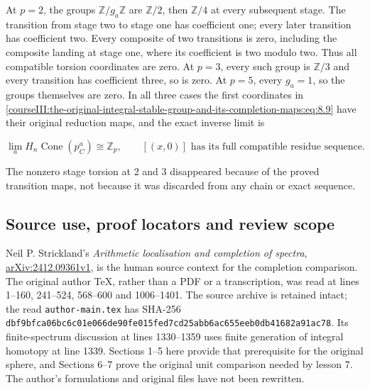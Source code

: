 At \(p=2\), the groups \(\mathbb Z/g_a\mathbb Z\) are \(\mathbb Z/2\), then \(\mathbb Z/4\) at every subsequent stage. The transition from stage two to stage one has coefficient one; every later transition has coefficient two. Every composite of two transitions is zero, including the composite landing at stage one, where its coefficient is two modulo two. Thus all compatible torsion coordinates are zero. At \(p=3\), every such group is \(\mathbb Z/3\) and every transition has coefficient three, so is zero. At \(p=5\), every \(g_a=1\), so the groups themselves are zero. In all three cases the first coordinates in \eqref{courseIII:the-original-integral-stable-group-and-its-completion-maps:eq:8.9} have their original reduction maps, and the exact inverse limit is

\begin{equation}
\lim_a H_n\operatorname{Cone}(p^a_C)\cong\mathbb Z_p,
 \qquad [(x,0)]\text{ has its full compatible residue sequence}.
 \label{courseIII:the-original-integral-stable-group-and-its-completion-maps:eq:8.12}
\end{equation}

The nonzero stage torsion at 2 and 3 disappeared because of the proved transition maps, not because it was discarded from any chain or exact sequence.

\subsection{Source use, proof locators and review scope}
\label{courseIII:the-original-integral-stable-group-and-its-completion-maps:integral-stable-sources}

\label{courseIII:the-original-integral-stable-group-and-its-completion-maps:section-9}

Neil P. Strickland's \emph{Arithmetic localisation and completion of spectra}, \href{https://arxiv.org/abs/2412.09361v1}{arXiv:2412.09361v1}, is the human source context for the completion comparison. The original author TeX, rather than a PDF or a transcription, was read at lines 1--160, 241--524, 568--600 and 1006--1401. The source archive is retained intact; the read \texttt{author-main.tex} has SHA-256 \texttt{dbf9bfca06bc6c01e066de90fe015fed7cd25abb6ac655eeb0db41682a91ac78}. Its finite-spectrum discussion at lines 1330--1359 uses finite generation of integral homotopy at line 1339. Sections 1--5 here provide that prerequisite for the original sphere, and Sections 6--7 prove the original unit comparison needed by lesson 7. The author's formulations and original files have not been rewritten.

